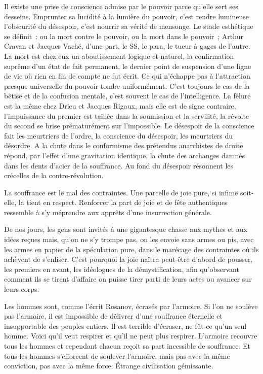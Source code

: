 \documentclass[french,twoside]{book} %
\begin{document}
Il existe une prise de conscience admise par le pouvoir parce qu’elle sert ses desseins. Emprunter sa lucidité à la lumière du pouvoir, c’est rendre lumineuse l’obscurité du désespoir, c’est nourrir sa vérité de mensonge. Le stade esthétique se définit : ou la mort contre le pouvoir, ou la mort dans le pouvoir ; Arthur Cravan et Jacques Vaché, d’une part, le SS, le para, le tueur à gages de l’autre. La mort est chez eux un aboutissement logique et naturel, la confirmation suprême d’un état de fait permanent, le dernier point de suspension d’une ligne de vie où rien en fin de compte ne fut écrit. Ce qui n’échappe pas à l’attraction presque universelle du pouvoir tombe uniformément. C’est toujours le cas de la bêtise et de la confusion mentale, c’est souvent le cas de l’intelligence. La fêlure est la même chez Drieu et Jacques Rigaux, mais elle est de signe contraire, l’impuissance du premier est taillée dans la soumission et la servilité, la révolte du second se brise prématurément sur l’impossible. Le désespoir de la conscience fait les meurtriers de l’ordre, la conscience du désespoir, les meurtriers du désordre. A la chute dans le conformisme des prétendus anarchistes de droite répond, par l’effet d’une gravitation identique, la chute des archanges damnés dans les dents d’acier de la souffrance. Au fond du désespoir résonnent les crécelles de la contre-révolution.\par
La souffrance est le mal des contraintes. Une parcelle de joie pure, si infime soit-elle, la tient en respect. Renforcer la part de joie et de fête authentiques ressemble à s’y méprendre aux apprêts d’une insurrection générale.\par
De nos jours, les gens sont invités à une gigantesque chasse aux mythes et aux idées reçues mais, qu’on ne s’y trompe pas, on les envoie sans armes ou pis, avec les armes en papier de la spéculation pure, dans le marécage des contraintes où ils achèvent de s’enliser. C’est pourquoi la joie naîtra peut-être d’abord de pousser, les premiers en avant, les idéologues de la démystification, afin qu’observant comment ils se tirent d’affaire on puisse tirer parti de leurs actes ou avancer sur leurs corps.\par
Les hommes sont, comme l’écrit Rosanov, écrasés par l’armoire. Si l’on ne soulève pas l’armoire, il est impossible de délivrer d’une souffrance éternelle et insupportable des peuples entiers. Il est terrible d’écraser, ne fût-ce qu’un seul homme. Voici qu’il veut respirer et qu’il ne peut plus respirer. L’armoire recouvre tous les hommes et cependant chacun reçoit sa part incessible de souffrance. Et tous les hommes s’efforcent de soulever l’armoire, mais pas avec la même conviction, pas avec la même force. Étrange civilisation gémissante.\par
\end{document}

